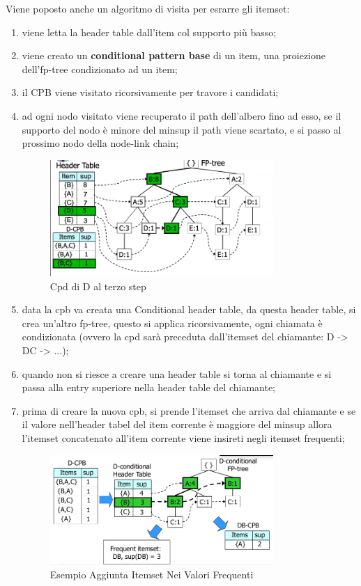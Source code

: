 \documentclass[12pt]{article}
\begin{document}
Viene poposto anche un algoritmo di visita per esrarre gli itemset:
\begin{enumerate}
    \item viene letta la header table dall'item col supporto pi\`u basso;
    \item viene creato un \textbf{conditional pattern base} di un item, una proiezione dell'fp-tree condizionato ad un item;
    \item il CPB viene visitato ricorsivamente per travore i candidati;
    \item ad ogni nodo visitato viene recuperato il path dell'albero fino ad esso, se il supporto del nodo \`e minore del minsup il path viene scartato, e si passo al prossimo nodo della node-link chain;
        \begin{figure}[H]
            \centering
            \includegraphics[width=0.8\textwidth]{cpd-di-d.png}
            \caption{Cpd di D al terzo step}
            \label{fig:cpd-di-d}
        \end{figure}
    \item data la cpb va creata una Conditional header table, da questa header table, si crea un'altro fp-tree, questo si applica ricorsivamente, ogni chiamata \`e condizionata (ovvero la cpd sar\`a preceduta dall'itemset del chiamante: D -> DC -> ...);
    \item quando non si riesce a creare una header table si torna al chiamante e si passa alla entry superiore nella header table del chiamante;
    \item prima di creare la nuova cpb, si prende l'itemset che arriva dal chiamante e se il valore nell'header tabel del item corrente \`e maggiore del minsup allora l'itemset concatenato all'item corrente viene insireti negli itemset frequenti;
        \begin{figure}[H]
            \centering
            \includegraphics[width=0.8\textwidth]{esempio-aggiunta-itemset-nei-valori-frequenti.png}
            \caption{Esempio Aggiunta Itemset Nei Valori Frequenti}
            \label{fig:esempio-aggiunta-itemset-nei-valori-frequenti}
        \end{figure}
\end{enumerate}
\end{document}
